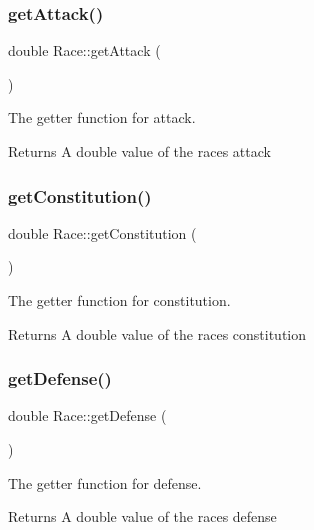 \subsubsection{\texorpdfstring{getAttack()}{getAttack()}}
{\footnotesize\ttfamily double Race\+::get\+Attack (\begin{DoxyParamCaption}{ }\end{DoxyParamCaption})}



The getter function for attack. 

\begin{DoxyReturn}{Returns}
A double value of the race\textquotesingle{}s attack 
\end{DoxyReturn}
\mbox{\label{class_race_a10097a6f7879d1f31e1f7fec6eb433ad}} 
\subsubsection{\texorpdfstring{getConstitution()}{getConstitution()}}
{\footnotesize\ttfamily double Race\+::get\+Constitution (\begin{DoxyParamCaption}{ }\end{DoxyParamCaption})}



The getter function for constitution. 

\begin{DoxyReturn}{Returns}
A double value of the race\textquotesingle{}s constitution 
\end{DoxyReturn}
\mbox{\label{class_race_a8f6db9fb65c4ca28323479378fe5d778}} 
\subsubsection{\texorpdfstring{getDefense()}{getDefense()}}
{\footnotesize\ttfamily double Race\+::get\+Defense (\begin{DoxyParamCaption}{ }\end{DoxyParamCaption})}



The getter function for defense. 

\begin{DoxyReturn}{Returns}
A double value of the race\textquotesingle{}s defense 
\end{DoxyReturn}
\mbox{\label{class_race_a7cde6aed828e203d613c09c5957fd351}} 
